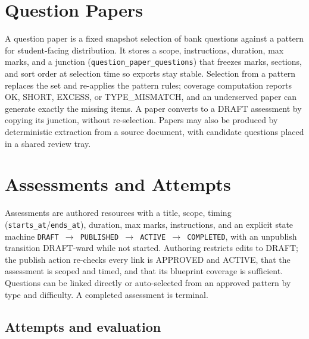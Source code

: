 \section{Question Papers}

A question paper is a fixed snapshot selection of bank questions against a
pattern for student-facing distribution. It stores a scope, instructions,
duration, max marks, and a junction (\texttt{question\_paper\_questions}) that
freezes marks, sections, and sort order at selection time so exports stay
stable. Selection from a pattern replaces the set and re-applies the pattern
rules; coverage computation reports OK, SHORT, EXCESS, or TYPE\_MISMATCH, and
an underserved paper can generate exactly the missing items. A paper converts
to a DRAFT assessment by copying its junction, without re-selection. Papers
may also be produced by deterministic extraction from a source document, with
candidate questions placed in a shared review tray.

\section{Assessments and Attempts}

Assessments are authored resources with a title, scope, timing
(\texttt{starts\_at}/\texttt{ends\_at}), duration, max marks, instructions, and
an explicit state machine \texttt{DRAFT $\rightarrow$ PUBLISHED $\rightarrow$
ACTIVE $\rightarrow$ COMPLETED}, with an unpublish transition DRAFT-ward while
not started. Authoring restricts edits to DRAFT; the publish action re-checks
every link is APPROVED and ACTIVE, that the assessment is scoped and timed, and
that its blueprint coverage is sufficient. Questions can be linked directly or
auto-selected from an approved pattern by type and difficulty. A completed
assessment is terminal.

\subsection{Attempts and evaluation}

